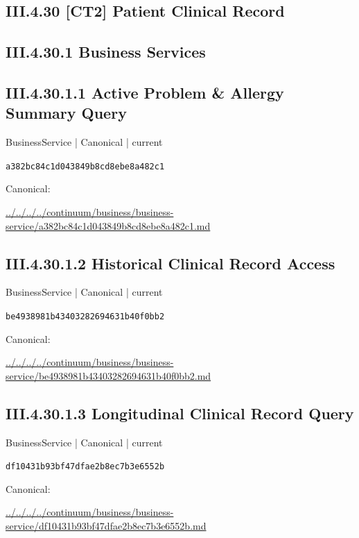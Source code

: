 \documentclass[10pt,a4paper]{article}
\begin{document}
\subsection*{III.4.30 [CT2] Patient Clinical Record}
\subsection*{III.4.30.1 Business Services}
\subsection*{III.4.30.1.1 Active Problem \& Allergy Summary Query}
{\small BusinessService | Canonical | current}\par
\texttt{a382bc84c1d043849b8cd8ebe8a482c1}\par
Canonical: \par
{\footnotesize\url{../../../../continuum/business/business-service/a382bc84c1d043849b8cd8ebe8a482c1.md}}\par
\subsection*{III.4.30.1.2 Historical Clinical Record Access}
{\small BusinessService | Canonical | current}\par
\texttt{be4938981b43403282694631b40f0bb2}\par
Canonical: \par
{\footnotesize\url{../../../../continuum/business/business-service/be4938981b43403282694631b40f0bb2.md}}\par
\subsection*{III.4.30.1.3 Longitudinal Clinical Record Query}
{\small BusinessService | Canonical | current}\par
\texttt{df10431b93bf47dfae2b8ec7b3e6552b}\par
Canonical: \par
{\footnotesize\url{../../../../continuum/business/business-service/df10431b93bf47dfae2b8ec7b3e6552b.md}}\par
\end{document}
